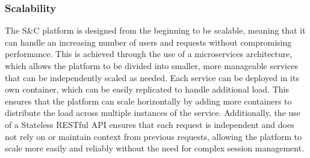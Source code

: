 \subsubsection{Scalability}
    The S\&C platform is designed from the beginning to be scalable, meaning that it can handle an increasing number of users and requests without compromising performance. This is achieved through the use of a microservices architecture, which allows the platform to be divided into smaller, more manageable services that can be independently scaled as needed. Each service can be deployed in its own container, which can be easily replicated to handle additional load. This ensures that the platform can scale horizontally by adding more containers to distribute the load across multiple instances of the service. Additionally, the use of a Stateless RESTful API ensures that each request is independent and does not rely on or maintain context from previous requests, allowing the platform to scale more easily and reliably without the need for complex session management.


